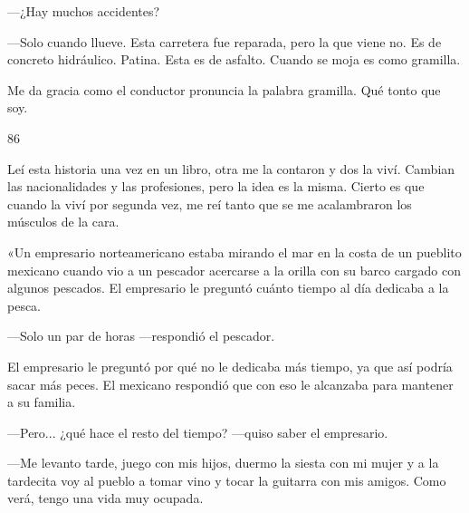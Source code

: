 \documentclass[12pt,twoside,openright,a5paper]{book}
\begin{document}
\nopagebreak

\vspace{0.5cm}

\nopagebreak

---¿Hay muchos accidentes?

---Solo cuando llueve. Esta carretera fue reparada, pero la que viene no. Es
de concreto hidráulico. Patina. Esta es de asfalto. Cuando se moja es
como gramilla.

Me da gracia como el conductor pronuncia la palabra gramilla.
Qué tonto que soy.

\vspace{0.5cm}

\hrulefill \hspace{0.1cm}\decofourleft\hspace{0.2cm} 86 \hspace{0.2cm}\decofourright \hspace{0.1cm}\hrulefill

\nopagebreak

\vspace{0.5cm}

\nopagebreak

Leí esta historia una vez en un libro, otra me la contaron y dos
la viví. Cambian las nacionalidades y las profesiones, pero la idea
es la misma. Cierto es que cuando la viví por segunda vez, me reí tanto
que se me acalambraron los músculos de la cara.

«Un empresario norteamericano estaba mirando el mar en la costa de un
pueblito mexicano cuando vio a un pescador acercarse a la orilla con
su barco cargado con algunos pescados. El empresario le preguntó cuánto
tiempo al día dedicaba a la pesca. 

---Solo un par de horas ---respondió el pescador. 

El empresario le preguntó por qué no le dedicaba más tiempo,
ya que así podría sacar más peces. El mexicano respondió que con eso
le alcanzaba para mantener a su familia. 

---Pero... ¿qué hace el resto del tiempo? ---quiso saber el empresario. 

---Me levanto tarde, juego con mis hijos,
duermo la siesta con mi mujer y a la tardecita voy al pueblo a tomar vino
y tocar la guitarra con mis amigos. Como verá, tengo una vida muy ocupada.
\end{document}
